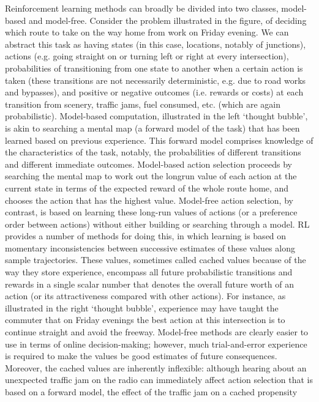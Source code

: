 Reinforcement learning methods can broadly be divided into two classes, model-based and model-free. Consider the problem illustrated in the
figure, of deciding which route to take on the way home from work on Friday evening. We can abstract this task as having states (in this case,
locations, notably of junctions), actions (e.g. going straight on or turning left or right at every intersection), probabilities of transitioning from one
state to another when a certain action is taken (these transitions are not necessarily deterministic, e.g. due to road works and bypasses), and
positive or negative outcomes (i.e. rewards or costs) at each transition from scenery, traffic jams, fuel consumed, etc. (which are again
probabilistic).
Model-based computation, illustrated in the left ‘thought bubble’, is akin to searching a mental map (a forward model of the task) that has been
learned based on previous experience. This forward model comprises knowledge of the characteristics of the task, notably, the probabilities of
different transitions and different immediate outcomes. Model-based action selection proceeds by searching the mental map to work out the longrun
value of each action at the current state in terms of the expected reward of the whole route home, and chooses the action that has the highest
value.
Model-free action selection, by contrast, is based on learning these long-run values of actions (or a preference order between actions) without
either building or searching through a model. RL provides a number of methods for doing this, in which learning is based on momentary
inconsistencies between successive estimates of these values along sample trajectories. These values, sometimes called cached values because
of the way they store experience, encompass all future probabilistic transitions and rewards in a single scalar number that denotes the overall future
worth of an action (or its attractiveness compared with other actions). For instance, as illustrated in the right ‘thought bubble’, experience may have
taught the commuter that on Friday evenings the best action at this intersection is to continue straight and avoid the freeway.
Model-free methods are clearly easier to use in terms of online decision-making; however, much trial-and-error experience is required to make the
values be good estimates of future consequences. Moreover, the cached values are inherently inflexible: although hearing about an unexpected
traffic jam on the radio can immediately affect action selection that is based on a forward model, the effect of the traffic jam on a cached propensity
